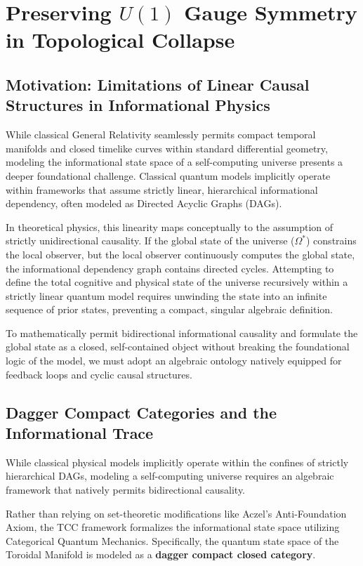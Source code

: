 \documentclass[12pt,openany]{book}
\theoremstyle{plain}
\theoremstyle{definition}
\theoremstyle{remark}
\begin{document}
\chapter{Preserving $U(1)$ Gauge Symmetry in Topological Collapse}

\section{Motivation: Limitations of Linear Causal Structures in Informational Physics}
While classical General Relativity seamlessly permits compact temporal manifolds and closed timelike curves within standard differential geometry, modeling the informational state space of a self-computing universe presents a deeper foundational challenge. Classical quantum models implicitly operate within frameworks that assume strictly linear, hierarchical informational dependency, often modeled as Directed Acyclic Graphs (DAGs).

In theoretical physics, this linearity maps conceptually to the assumption of strictly unidirectional causality. If the global state of the universe ($\Omega^*$) constrains the local observer, but the local observer continuously computes the global state, the informational dependency graph contains directed cycles. Attempting to define the total cognitive and physical state of the universe recursively within a strictly linear quantum model requires unwinding the state into an infinite sequence of prior states, preventing a compact, singular algebraic definition.

To mathematically permit bidirectional informational causality and formulate the global state as a closed, self-contained object without breaking the foundational logic of the model, we must adopt an algebraic ontology natively equipped for feedback loops and cyclic causal structures.

\section{Dagger Compact Categories and the Informational Trace}

While classical physical models implicitly operate within the confines of strictly hierarchical DAGs, modeling a self-computing universe requires an algebraic framework that natively permits bidirectional causality. 

Rather than relying on set-theoretic modifications like Aczel's Anti-Foundation Axiom, the TCC framework formalizes the informational state space utilizing Categorical Quantum Mechanics. Specifically, the quantum state space of the Toroidal Manifold is modeled as a \textbf{dagger compact closed category}. 
\end{document}
